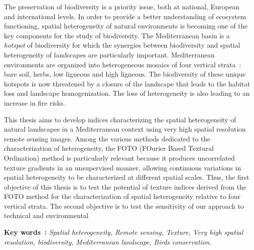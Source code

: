 \noindent The preservation of biodiversity is a priority issue, both at national, European and international levels. In order to provide a better understanding of ecosystem functioning, spatial heterogeneity of natural environments is becoming one of the key components for the study of biodiversity. The Mediterranean basin is a \emph{hotspot} of biodiversity for which the synergies between biodiversity and spatial heterogeneity of landscapes are particularly important. Mediterranean environments are organized into heterogeneous mosaics of four vertical strata~: bare soil, herbs, low ligneous and high ligneous. The biodiversity of these unique hotspots is now threatened by a closure of the landscape that leads to the habitat loss and landscape homogenization. The loss of heterogeneity is also leading to an increase in fire risks.

\noindent This thesis aims to develop indices characterizing the spatial heterogeneity of natural landscapes in a Mediterranean context using very high spatial resolution remote sensing images. Among the various methods dedicated to the characterization of heterogeneity, the FOTO (FOurier Based Textural Ordination) method is particularly relevant because it produces uncorrelated texture gradients in an unsupervised manner, allowing continuous variations in spatial heterogeneity to be characterized at different spatial scales. Thus, the first objective of this thesis is to test the potential of texture indices derived from the FOTO method for the characterization of spatial heterogeneity relative to four vertical strata. The second objective is to test the sensitivity of our approach to technical and environmental 

\noindent\textbf{Key words~:}{ \it Spatial heterogeneity, Remote sensing, Texture, Very high spatial resolution, biodiversity, Mediterranean landscape, Birds conservation}.

